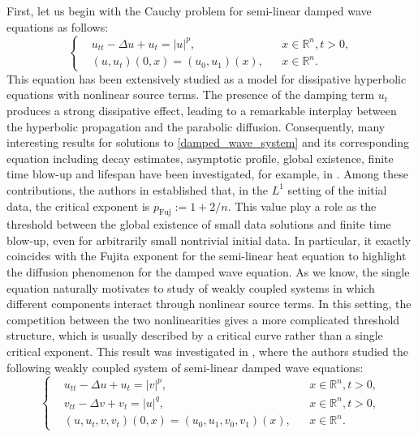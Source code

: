 \documentclass[11pt,reqno]{amsart}
\begin{document}
	First, let us begin with the Cauchy problem for semi-linear damped wave equations as follows:
	\begin{equation}\label{damped_wave_system}
		\left\{
		\begin{aligned}
			&u_{tt}-\Delta u+u_t=|u|^p, && x\in\mathbb{R}^n, t>0,\\
			&(u,u_t)(0,x)=(u_0,u_1)(x),&&x\in \mathbb{R}^n.
		\end{aligned}
		\right.
	\end{equation}
	This equation has been extensively studied as a model for dissipative hyperbolic equations with nonlinear source terms. The presence of the damping term $u_t$ produces a strong dissipative effect, leading to a remarkable interplay between the hyperbolic propagation and the parabolic diffusion. Consequently, many interesting results for solutions to \eqref{damped_wave_system} and its corresponding equation including decay estimates, asymptotic profile, global existence, finite time blow-up and lifespan have been investigated, for example, in \cite{Mat1976,Ikehata2002,Ikehata2004,Radu2011,IkeOga2016,Ikehata2019}.  Among these contributions, the authors in \cite{Todorova2001} established that, in the $L^1$ setting of the initial data, the critical exponent is $p_{\mathrm{Fuj}}:=1+2/n$. This value play a role as the threshold between the global existence of small data solutions and finite time blow-up, even for arbitrarily small nontrivial initial data. In particular, it exactly coincides with the Fujita exponent for the semi-linear heat equation to highlight the diffusion phenomenon for the damped wave equation. As we know, the single equation naturally motivates to study of weakly coupled systems in which different components interact through nonlinear source terms. In this setting, the competition between the two nonlinearities gives a more complicated threshold structure, which is usually described by a critical curve rather than a single critical exponent. This result was investigated in \cite{NishiharaWakasugi,Sun2007,Takeda2009}, where the authors studied the following weakly coupled system of semi-linear damped wave equations:
	\begin{equation}\label{System_weakly_coupled_damped_wave}
		\left\{
		\begin{aligned}
			&u_{tt}-\Delta u+u_t=|v|^p,&&x\in \mathbb{R}^n,t>0,\\
			&v_{tt}-\Delta v+v_t=|u|^{q},&&x\in \mathbb{R}^n,t>0,\\
			&(u,u_t,v,v_t)(0,x)=(u_0,u_1,v_0,v_1)(x),&&x\in \mathbb{R}^n.
		\end{aligned}
		\right.
	\end{equation}
\end{document}
